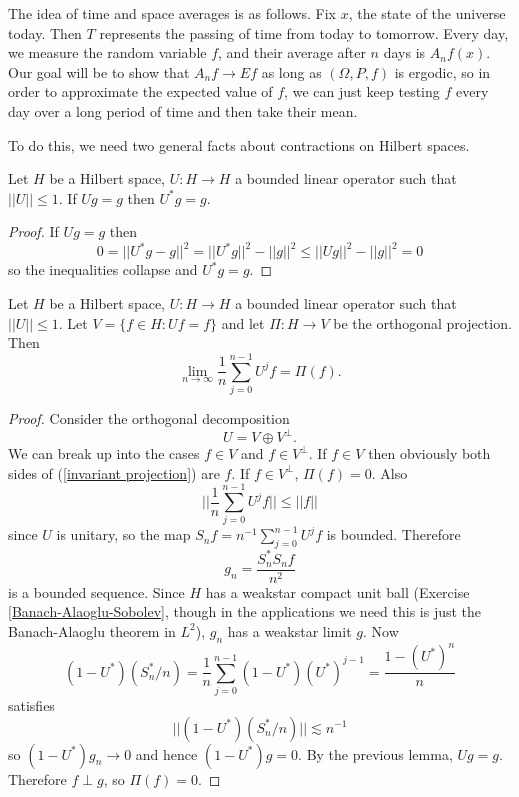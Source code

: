 The idea of time and space averages is as follows. Fix $x$, the state of the universe today. Then $T$ represents the passing of time from today to tomorrow.
Every day, we measure the random variable $f$, and their average after $n$ days is $A_nf(x)$.
Our goal will be to show that $A_nf \to Ef$ as long as $(\Omega, P, f)$ is ergodic, so in order to approximate the expected value of $f$, we can just keep testing $f$ every day over a long period of time and then take their mean.

To do this, we need two general facts about contractions on Hilbert spaces.
\begin{lemma}
Let $H$ be a Hilbert space, $U: H \to H$ a bounded linear operator such that $||U|| \leq 1$.
If $Ug = g$ then $U^*g = g$.
\end{lemma}
\begin{proof}
If $Ug = g$ then
$$0 = ||U^*g - g||^2 = ||U^*g||^2 - ||g||^2 \leq ||Ug||^2 - ||g||^2 = 0$$
so the inequalities collapse and $U^*g = g$.
\end{proof}

\begin{lemma}
Let $H$ be a Hilbert space, $U: H \to H$ a bounded linear operator such that $||U|| \leq 1$.
Let $V = \{f \in H: Uf = f\}$ and let $\Pi: H \to V$ be the orthogonal projection. Then
\begin{equation}
\label{invariant projection}
\lim_{n \to \infty} \frac{1}{n} \sum_{j=0}^{n-1} U^jf = \Pi(f).
\end{equation}
\end{lemma}
\begin{proof}
Consider the orthogonal decomposition
$$U = V \oplus V^\perp.$$
We can break up into the cases $f \in V$ and $f \in V^\perp$.
If $f \in V$ then obviously both sides of (\ref{invariant projection}) are $f$.
If $f \in V^\perp$, $\Pi(f) = 0$.
Also
$$||\frac{1}{n} \sum_{j=0}^{n-1} U^jf|| \leq ||f||$$
since $U$ is unitary, so the map $S_nf = n^{-1} \sum_{j=0}^{n-1} U^jf$ is bounded.
Therefore
$$g_n = \frac{S_n^*S_nf}{n^2}$$
is a bounded sequence. Since $H$ has a weakstar compact unit ball (Exercise \ref{Banach-Alaoglu-Sobolev}, though in the applications we need this is just the Banach-Alaoglu theorem in $L^2$), $g_n$ has a weakstar limit $g$.
Now
$$(1 - U^*)(S_n^*/n) = \frac{1}{n} \sum_{j=0}^{n-1} (1 - U^*)(U^*)^{j-1} = \frac{1 - (U^*)^n}{n}$$
satisfies
$$||(1 - U^*)(S_n^*/n)|| \lesssim n^{-1}$$
so $(1 - U^*)g_n \to 0$ and hence $(1 - U^*)g = 0$.
By the previous lemma, $Ug = g$. Therefore $f \perp g$, so $\Pi(f) = 0$.
\end{proof}


